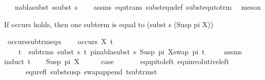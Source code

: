 \begin{isabellebody}
\ \ \ {\isachardoublequoteopen}nabla{\isasymTurnstile}subst\ s{}{\isasymapprox}subst\ s{}{\isachardoublequoteclose}\isanewline
%
\isadelimproof
\ \ %
\endisadelimproof
%
\isatagproof
{}\isamarkupfalse%
\ assms\ equ{\isacharunderscore}{\kern0pt}trans\ subst{\isacharunderscore}{\kern0pt}equ{\isacharunderscore}{\kern0pt}def\ subst{\isacharunderscore}{\kern0pt}equ{\isacharunderscore}{\kern0pt}to{\isacharunderscore}{\kern0pt}trm\ \isamarkupfalse%
\ meson%
\endisatagproof
{\isafoldproof}%
%
\isadelimproof
%
\endisadelimproof
%
\begin{isamarkuptext}%
If occurs holds, then one subterm is equal to (subst s (Susp pi X))%
\end{isamarkuptext}\isamarkuptrue%
\isamarkupfalse%
\ occurs{\isacharunderscore}{\kern0pt}sub{\isacharunderscore}{\kern0pt}trm{\isacharunderscore}{\kern0pt}equ{\isacharcolon}{\kern0pt}\ \isanewline
\ \ \ {\isachardoublequoteopen}occurs\ X\ t{}{\isachardoublequoteclose}\isanewline
\ \ \ {\isachardoublequoteopen}{\isasymexists}\ t{}\ {\isasymin}\ sub{\isacharunderscore}{\kern0pt}trms\ {\isacharparenleft}{\kern0pt}subst\ s\ t{}{\isacharparenright}{\kern0pt}{\isachardot}{\kern0pt}\ {\isacharparenleft}{\kern0pt}{\isasymexists}pi{\isachardot}{\kern0pt}{\isacharparenleft}{\kern0pt}nabla{\isasymturnstile}subst\ s\ {\isacharparenleft}{\kern0pt}Susp\ pi{}\ X{\isacharparenright}{\kern0pt}{\isasymapprox}{\isacharparenleft}{\kern0pt}swap\ pi\ t{}{\isacharparenright}{\kern0pt}{\isacharparenright}{\kern0pt}{\isacharparenright}{\kern0pt}{\isachardoublequoteclose}\ \isanewline
%
\isadelimproof
\ \ %
\endisadelimproof
%
\isatagproof
{}\isamarkupfalse%
\ assms\isanewline
{}\isamarkupfalse%
{\isacharparenleft}{\kern0pt}induct\ t{}{\isacharparenright}{\kern0pt}\isanewline
\ \ \isamarkupfalse%
\ {\isacharparenleft}{\kern0pt}Susp\ pi{\isacharprime}{\kern0pt}\ X{\isacharparenright}{\kern0pt}\isanewline
\ \ \isamarkupfalse%
\ \isamarkupfalse%
\ {\isacharquery}{\kern0pt}case\ \isanewline
\ \ \ \ \isamarkupfalse%
\ equ{\isacharunderscore}{\kern0pt}pi{\isacharunderscore}{\kern0pt}to{\isacharunderscore}{\kern0pt}left\ equ{\isacharunderscore}{\kern0pt}involutive{\isacharunderscore}{\kern0pt}left\ \isanewline
\ \ \ \ \ \ equ{\isacharunderscore}{\kern0pt}refl\ subst{\isacharunderscore}{\kern0pt}susp\ swap{\isacharunderscore}{\kern0pt}append\ t{\isacharunderscore}{\kern0pt}sub{\isacharunderscore}{\kern0pt}trms{\isacharunderscore}{\kern0pt}t\isanewline

\end{isabellebody}
